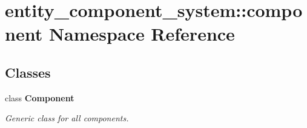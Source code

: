 \section{entity\+\_\+component\+\_\+system\+:\+:component Namespace Reference}
\label{namespaceentity__component__system_1_1component}
\subsection*{Classes}
\begin{DoxyCompactItemize}
\item 
class {\bf Component}
\begin{DoxyCompactList}\small\item\em Generic class for all components. \end{DoxyCompactList}\end{DoxyCompactItemize}
